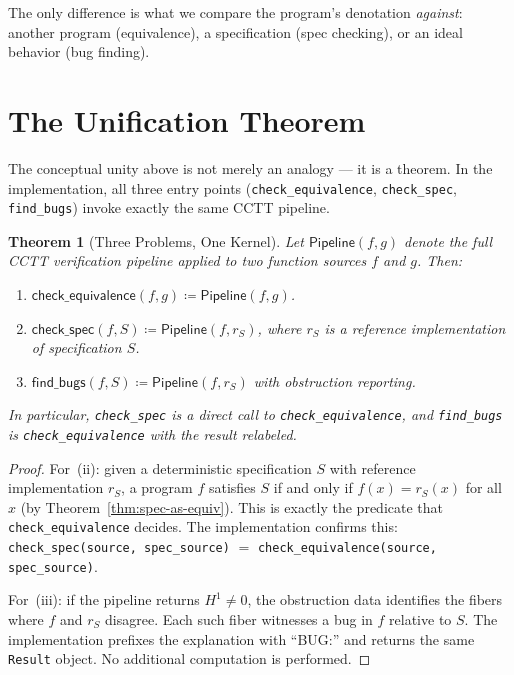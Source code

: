 \documentclass[11pt,a4paper]{report}
\theoremstyle{definition}
\theoremstyle{plain}
\newtheorem{theorem}[definition]{Theorem}
\newcommand{\Hone}{H^1}
\begin{document}
The only difference is what we compare the program's denotation
\emph{against}: another program (equivalence), a specification
(spec checking), or an ideal behavior (bug finding).

\section{The Unification Theorem}

The conceptual unity above is not merely an analogy --- it is a
theorem.  In the implementation, all three entry points
(\texttt{check\_equivalence}, \texttt{check\_spec}, \texttt{find\_bugs})
invoke exactly the same CCTT pipeline.

\begin{theorem}[Three Problems, One Kernel]
\label{thm:unification}
Let $\mathsf{Pipeline}(f, g)$ denote the full CCTT verification
pipeline applied to two function sources $f$ and $g$.  Then:
\begin{enumerate}[label=(\roman*)]
  \item $\mathsf{check\_equivalence}(f, g) \coloneqq \mathsf{Pipeline}(f, g)$.
  \item $\mathsf{check\_spec}(f, S) \coloneqq \mathsf{Pipeline}(f, r_S)$,
    where $r_S$ is a reference implementation of specification $S$.
  \item $\mathsf{find\_bugs}(f, S) \coloneqq \mathsf{Pipeline}(f, r_S)$
    with obstruction reporting.
\end{enumerate}
In particular, \texttt{check\_spec} is a direct call to
\texttt{check\_equivalence}, and \texttt{find\_bugs} is
\texttt{check\_equivalence} with the result relabeled.
\end{theorem}

\begin{proof}
For~(ii): given a deterministic specification $S$ with reference
implementation $r_S$, a program $f$ satisfies $S$ if and only if
$f(x) = r_S(x)$ for all $x$ (by Theorem~\ref{thm:spec-as-equiv}).
This is exactly the predicate that \texttt{check\_equivalence}
decides.  The implementation confirms this:
\texttt{check\_spec(source, spec\_source)} $=$ 
\texttt{check\_equivalence(source, spec\_source)}.

For~(iii): if the pipeline returns $\Hone \neq 0$, the obstruction
data identifies the fibers where $f$ and $r_S$ disagree.  Each such
fiber witnesses a bug in $f$ relative to $S$.  The implementation
prefixes the explanation with ``BUG:'' and returns the same
\texttt{Result} object.  No additional computation is performed.
\end{proof}
\end{document}
